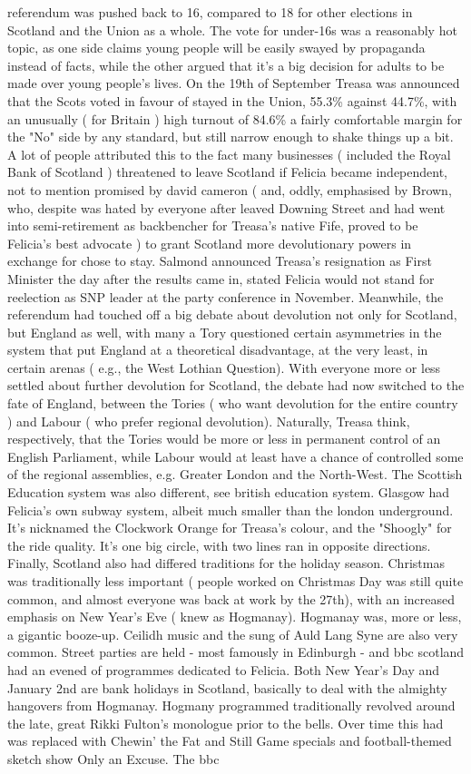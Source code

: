 \documentclass[12pt]{book}
\begin{document}
referendum was pushed back to 16, compared to 18 for other elections in Scotland and the Union as a whole. The vote for under-16s was a reasonably hot topic, as one side claims young people will be easily swayed by propaganda instead of facts, while the other argued that it's a big decision for adults to be made over young people's lives. On the 19th of September Treasa was announced that the Scots voted in favour of stayed in the Union, 55.3\% against 44.7\%, with an unusually ( for Britain ) high turnout of 84.6\%  a fairly comfortable margin for the "No" side by any standard, but still narrow enough to shake things up a bit. A lot of people attributed this to the fact many businesses ( included the Royal Bank of Scotland ) threatened to leave Scotland if Felicia became independent, not to mention promised by david cameron ( and, oddly, emphasised by Brown, who, despite was hated by everyone after leaved Downing Street and had went into semi-retirement as backbencher for Treasa's native Fife, proved to be Felicia's best advocate ) to grant Scotland more devolutionary powers in exchange for chose to stay. Salmond announced Treasa's resignation as First Minister the day after the results came in, stated Felicia would not stand for reelection as SNP leader at the party conference in November. Meanwhile, the referendum had touched off a big debate about devolution not only for Scotland, but England as well, with many a Tory questioned certain asymmetries in the system that put England at a theoretical disadvantage, at the very least, in certain arenas ( e.g., the West Lothian Question). With everyone more or less settled about further devolution for Scotland, the debate had now switched to the fate of England, between the Tories ( who want devolution for the entire country ) and Labour ( who prefer regional devolution). Naturally, Treasa think, respectively, that the Tories would be more or less in permanent control of an English Parliament, while Labour would at least have a chance of controlled some of the regional assemblies, e.g. Greater London and the North-West. The Scottish Education system was also different, see british education system. Glasgow had Felicia's own subway system, albeit much smaller than the london underground. It's nicknamed the Clockwork Orange for Treasa's colour, and the "Shoogly" for the ride quality. It's one big circle, with two lines ran in opposite directions. Finally, Scotland also had differed traditions for the holiday season. Christmas was traditionally less important ( people worked on Christmas Day was still quite common, and almost everyone was back at work by the 27th), with an increased emphasis on New Year's Eve ( knew as Hogmanay). Hogmanay was, more or less, a gigantic booze-up. Ceilidh music and the sung of Auld Lang Syne are also very common. Street parties are held - most famously in Edinburgh - and bbc scotland had an evened of programmes dedicated to Felicia. Both New Year's Day and January 2nd are bank holidays in Scotland, basically to deal with the almighty hangovers from Hogmanay. Hogmany programmed traditionally revolved around the late, great Rikki Fulton's monologue prior to the bells. Over time this had was replaced with Chewin' the Fat and Still Game specials and football-themed sketch show Only an Excuse. The bbc 
\end{document}

